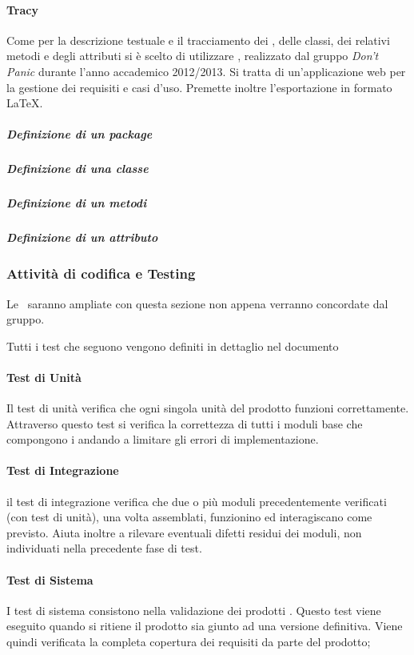 \documentclass[12pt,a4paper]{article}
\begin{document}
\paragraph{Tracy}
Come  per la descrizione testuale e il tracciamento dei , delle classi, dei relativi metodi e degli attributi si è scelto di utilizzare , realizzato dal gruppo \textit{Don’t Panic} durante l’anno accademico 2012/2013. Si tratta di un’applicazione web per la gestione dei requisiti e casi d’uso. Premette inoltre l’esportazione in formato \LaTeX{}.

\subparagraph{Definizione di un package}
\TODO{}

\subparagraph{Definizione di una classe}
\TODO{}

\subparagraph{Definizione di un metodi}
\TODO{}

\subparagraph{Definizione di un attributo}
\TODO{}

\subsubsection{Attività di codifica e Testing}
Le \NdP\ saranno ampliate con questa sezione non appena verranno concordate dal gruppo.

Tutti i test che seguono vengono definiti in dettaglio nel documento \PdQ\ 

\paragraph{Test di Unità}
\TODO{}
Il test di unità verifica che ogni singola unità del prodotto  funzioni correttamente.
Attraverso questo test si verifica la correttezza di tutti i moduli base che compongono i  andando
a limitare gli errori di implementazione.

\paragraph{Test di Integrazione}
\TODO{}
il test di integrazione verifica che due o più moduli precedentemente verificati (con test di unità), una volta assemblati, funzionino ed interagiscano come previsto. Aiuta inoltre a rilevare eventuali difetti residui dei moduli, non individuati nella precedente fase di test.

\paragraph{Test di Sistema}
\TODO{}
I test di sistema consistono nella validazione dei prodotti . Questo test viene eseguito quando si ritiene il prodotto sia giunto ad una versione definitiva. Viene quindi verificata la completa copertura dei requisiti da parte del prodotto;
\end{document}
